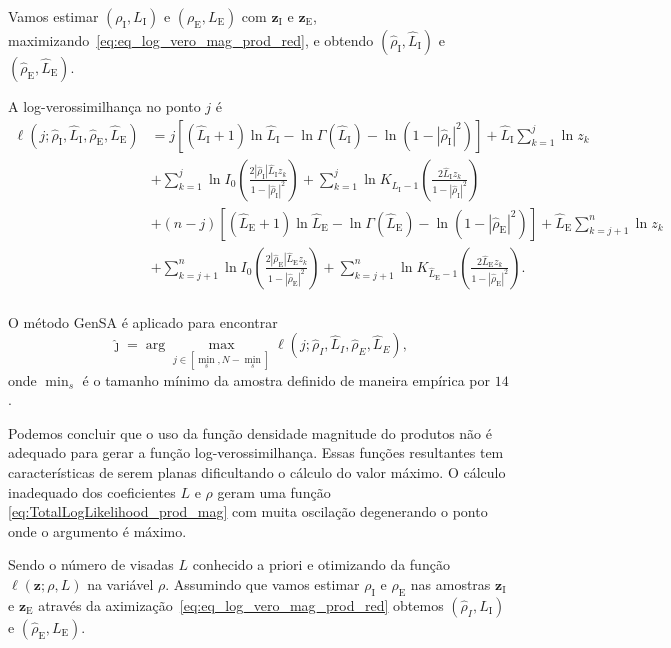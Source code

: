 Vamos estimar $(\rho_\text{I},L_\text{I})$ e $(\rho_\text{E},L_\text{E})$ com $\bm z_\text{I}$ e $\bm z_\text{E}$, maximizando~\eqref{eq:eq_log_vero_mag_prod_red}, e obtendo $(\widehat{\rho}_\text{I}, \widehat{L}_\text{I})$ e $(\widehat{\rho}_\text{E}, \widehat{L}_\text{E})$.

A log-verossimilhança no ponto $j$ é
\begin{equation}\label{eq:TotalLogLikelihood_prod_mag}
\begin{split}
\ell(j;\widehat{\rho}_\text{I}, \widehat{L}_\text{I}, \widehat{\rho}_\text{E}, \widehat{L}_\text{E})&
=j\left[(\widehat{L}_\text{I}+1)\ln \widehat{L}_\text{I}-\ln\Gamma(\widehat{L}_\text{I})-\ln(1-|\widehat{\rho}_\text{I}|^2)\right]
+\widehat{L}_\text{I}\sum_{k=1}^{j} \ln z_k\\
&+\sum_{k=1}^{j}\ln I_0\left(\frac{2|\widehat{\rho}_\text{I}|\widehat{L}_\text{I}z_k}{1-|\widehat{\rho}_\text{I}|^2}\right)
+ \sum_{k=1}^{j}\ln K_{\widehat{L}_\text{I}-1}\left(\frac{2\widehat{L}_\text{I}z_k}{1-|\widehat{\rho}_\text{I}|^2}\right)\\
&+(n-j)\left[(\widehat{L}_\text{E}+1)\ln \widehat{L}_\text{E}-\ln\Gamma(\widehat{L}_\text{E})-\ln(1-|\widehat{\rho}_\text{E}|^2)\right]
+\widehat{L}_\text{E}\sum_{k=j+1}^{n} \ln z_k\\
&+\sum_{k=j+1}^{n}\ln I_0\left(\frac{2|\widehat{\rho}_\text{E}|\widehat{L}_\text{E}z_k}{1-|\widehat{\rho}_\text{E}|^2}\right)
+ \sum_{k=j+1}^{n}\ln K_{\widehat{L}_\text{E}-1}\left(\frac{2\widehat{L}_\text{E}z_k}{1-|\widehat{\rho}_\text{E}|^2}\right).\\
\end{split}
\end{equation}

O método GenSA é aplicado para encontrar
$$
\widehat{\jmath}= \arg\max\limits_{j\in [\min_s,N-\min_s]}\ell(j;\widehat{\rho}_I, \widehat{L}_I,\widehat{\rho}_E, \widehat{L}_E),
$$ 
onde $\min_s$ é o tamanho mínimo da amostra definido de maneira empírica por $14$.

Podemos concluir que o uso da função densidade magnitude do produtos não é adequado para gerar a função log-verossimilhança. Essas funções resultantes tem características de serem planas dificultando o cálculo do valor máximo. O cálculo inadequado dos coeficientes $L$  e $\rho$ geram uma função \eqref{eq:TotalLogLikelihood_prod_mag} com muita oscilação degenerando o ponto onde o argumento é máximo.

Sendo o número de visadas $L$ conhecido a priori e otimizando da função $\ell(\bm z;\rho, L)$  na variável $\rho$. Assumindo que vamos  estimar $\rho_\text{I}$ e $\rho_\text{E}$ nas amostras $\bm z_\text{I}$ e $\bm z_\text{E}$ através da   aximização~\eqref{eq:eq_log_vero_mag_prod_red} obtemos  $(\widehat{\rho}_{I}, L_\text{I})$ e $(\widehat{\rho}_\text{E}, L_\text{E})$.

